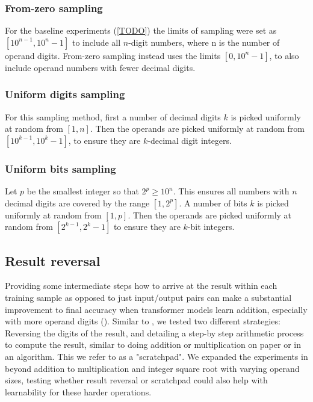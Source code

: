 \subsubsection{From-zero sampling}

For the baseline experiments (\cref{TODO}) the limits of sampling were set as $[10^{n-1}, 10^n - 1]$ to include all $n$-digit numbers, where n is the number of operand digits. From-zero sampling instead uses the limits $[0, 10^n - 1]$, to also include operand numbers with fewer decimal digits.

\subsubsection{Uniform digits sampling}

For this sampling method, first a number of decimal digits $k$ is picked uniformly at random from $[1, n]$. Then the operands are picked uniformly at random from $[10^{k-1}, 10^k - 1]$, to ensure they are $k$-decimal digit integers.

\subsubsection{Uniform bits sampling}

Let $p$ be the smallest integer so that $2^p \geq {10}^n$. This ensures all numbers with $n$ decimal digits are covered by the range $[1, 2^p]$.
A number of bits $k$ is picked uniformly at random from $[1, p]$. Then the operands are picked uniformly at random from $[2^{k-1}, 2^k - 1]$ to ensure they are $k$-bit integers.




\subsection{Result reversal}
\label{arith:reversal}

Providing some intermediate steps how to arrive at the result within each training sample as opposed to just input/output pairs can make a substantial improvement to final accuracy when transformer models learn addition, especially with more operand digits ().
Similar to \cite{teaching}, we tested two different strategies: Reversing the digits of the result, and detailing a step-by step arithmetic process to compute the result, similar to doing addition or multiplication on paper or in an algorithm. This we refer to as a "scratchpad". We expanded the experiments in \cite{teaching} beyond addition to multiplication and integer square root with varying operand sizes, testing whether result reversal or scratchpad could also help with learnability for these harder operations.

